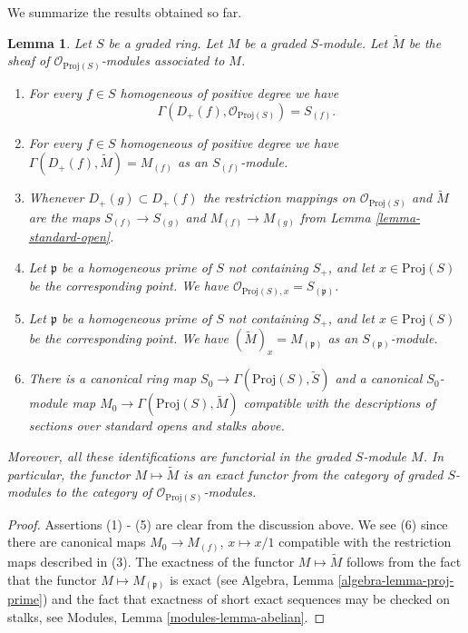 \documentclass{stacks-project}
\theoremstyle{plain}
\newtheorem{lemma}[subsection]{Lemma}
\theoremstyle{definition}
\theoremstyle{remark}
\numberwithin{equation}{subsection}
\begin{document}
\noindent
We summarize the results obtained so far.

\begin{lemma}
\label{lemma-proj-sheaves}
Let $S$ be a graded ring. Let $M$ be a graded $S$-module.
Let $\widetilde M$ be the sheaf of $\mathcal{O}_{\text{Proj}(S)}$-modules
associated to $M$.
\begin{enumerate}
\item For every $f \in S$ homogeneous of positive degree we have
$$
\Gamma(D_{+}(f), \mathcal{O}_{\text{Proj}(S)}) = S_{(f)}.
$$
\item For every $f\in S$ homogeneous of positive degree
we have $\Gamma(D_{+}(f), \widetilde M) = M_{(f)}$
as an $S_{(f)}$-module.
\item Whenever $D_{+}(g) \subset D_{+}(f)$ the restriction mappings
on $\mathcal{O}_{\text{Proj}(S)}$ and $\widetilde M$
are the maps
$S_{(f)} \to S_{(g)}$ and $M_{(f)} \to M_{(g)}$ from Lemma
\ref{lemma-standard-open}.
\item Let $\mathfrak p$ be a homogeneous prime of $S$ not containing
$S_{+}$, and let $x \in \text{Proj}(S)$
be the corresponding point. We have
$\mathcal{O}_{\text{Proj}(S), x} = S_{(\mathfrak p)}$.
\item Let $\mathfrak p$ be a homogeneous prime of $S$ not containing
$S_{+}$, and let $x \in \text{Proj}(S)$
be the corresponding point. We have $(\widetilde M)_x = M_{(\mathfrak p)}$
as an $S_{(\mathfrak p)}$-module.
\item
\label{item-map}
There is a canonical ring map
$
S_0 \longrightarrow \Gamma(\text{Proj}(S), \widetilde S)
$
and a canonical $S_0$-module map
$
M_0 \longrightarrow \Gamma(\text{Proj}(S), \widetilde M)
$
compatible with the descriptions of sections over standard opens
and stalks above.
\end{enumerate}
Moreover, all these identifications are functorial in the graded
$S$-module $M$. In particular, the functor $M \mapsto \widetilde M$
is an exact functor from the category of graded $S$-modules
to the category of $\mathcal{O}_{\text{Proj}(S)}$-modules.
\end{lemma}

\begin{proof}
Assertions (1) - (5) are clear from the discussion above.
We see (6) since there are canonical maps $M_0 \to M_{(f)}$,
$x \mapsto x/1$ compatible with the restriction maps
described in (3). The exactness of the functor $M \mapsto \widetilde M$
follows from the fact that the functor $M \mapsto M_{(\mathfrak p)}$
is exact (see Algebra, Lemma \ref{algebra-lemma-proj-prime})
and the fact that exactness of short exact sequences
may be checked on stalks, see
Modules, Lemma \ref{modules-lemma-abelian}.
\end{proof}
\end{document}
